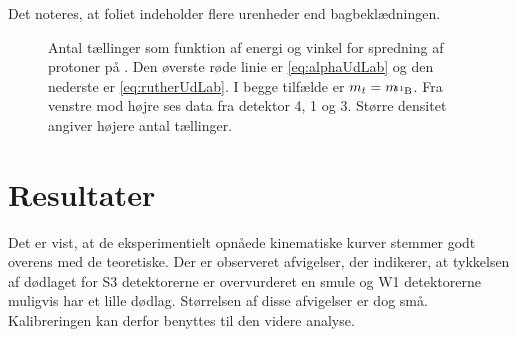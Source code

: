 Det noteres, at \Bor foliet indeholder flere urenheder end bagbeklædningen.
\begin{figure}[ht]
  \centering
  \hfill
  \caption{Antal tællinger som funktion af energi og vinkel for spredning af protoner på \Be. Den
    øverste røde linie er \cref{eq:alphaUdLab} og den nederste er \cref{eq:rutherUdLab}. I begge
    tilfælde er $m_{t} = m_{\!\!\Bor}$. Fra venstre mod højre ses data fra detektor 4, 1 og
    3. Større densitet angiver højere antal tællinger.}
  \label{fig:1077}
\end{figure}

\section{Resultater}
\label{sec:ruther-konklusion}
Det er vist, at de eksperimentielt opnåede kinematiske kurver stemmer godt overens med de
teoretiske. Der er observeret afvigelser, der indikerer, at tykkelsen af dødlaget for S3
detektorerne er overvurderet en smule og W1 detektorerne muligvis har et lille dødlag. Størrelsen af
disse afvigelser er dog små. Kalibreringen kan derfor benyttes til den videre analyse.







